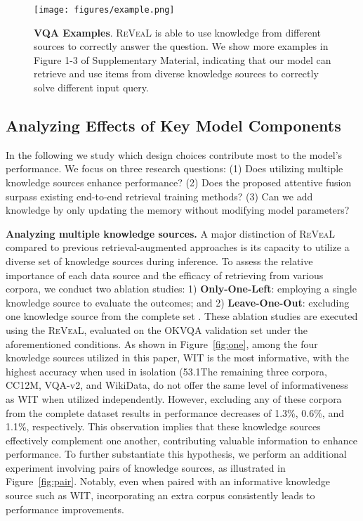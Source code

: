 \documentclass[10pt,twocolumn,letterpaper]{article}
\newcommand{\method}{R\textsc{e}V\textsc{ea}L\xspace}
\begin{document}
\begin{figure}[t!]
    \centering
    \vspace{-.1in}
    \texttt{[image: figures/example.png]}
        \vspace{-.2in}
    \caption{\textbf{VQA Examples}. \method is able to use knowledge from different sources to correctly answer the question. We show more examples in Figure 1-3 of Supplementary Material, indicating that our model can retrieve and use items from diverse knowledge sources to correctly solve different input query.}
    \label{fig:example}
\end{figure}


\subsection{Analyzing Effects of Key Model Components}\label{sec:ablation}
In the following we study which design choices contribute most to the model's performance. We focus on three research questions:
(1) Does utilizing multiple knowledge sources enhance performance?
(2) Does the proposed attentive fusion surpass existing end-to-end retrieval training methods?
(3) Can we add knowledge by only updating the memory without modifying model parameters?

\textbf{Analyzing multiple knowledge sources.}
A major distinction of \method compared to previous retrieval-augmented approaches is its capacity to utilize a diverse set of knowledge sources during inference. To assess the relative importance of each data source and the efficacy of retrieving from various corpora, we conduct two ablation studies: 1) \textbf{Only-One-Left}: employing a single knowledge source to evaluate the outcomes; and 2) \textbf{Leave-One-Out}: excluding one knowledge source from the complete set . These ablation studies are executed using the \method, evaluated on the OKVQA validation set under the aforementioned conditions.
As shown in Figure~\ref{fig:one}, among the four knowledge sources utilized in this paper, WIT is the most informative, with the highest accuracy when used in isolation (53.1The remaining three corpora, CC12M, VQA-v2, and WikiData, do not offer the same level of informativeness as WIT when utilized independently. However, excluding any of these corpora from the complete dataset results in performance decreases of 1.3\%, 0.6\%, and 1.1\%, respectively. This observation implies that these knowledge sources effectively complement one another, contributing valuable information to enhance performance. To further substantiate this hypothesis, we perform an additional experiment involving pairs of knowledge sources, as illustrated in Figure~\ref{fig:pair}. Notably, even when paired with an informative knowledge source such as WIT, incorporating an extra corpus consistently leads to performance improvements.
\end{document}
